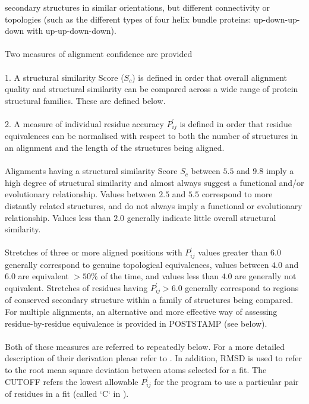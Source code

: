 secondary structures in similar orientations, but different
connectivity or topologies (such as the different types of four helix bundle
proteins: up-down-up-down with up-up-down-down).  \\
\\
Two measures of alignment confidence are provided \cite{rb92b}\\
\\
1. A structural similarity Score ($S_{c}$) is defined in order that
overall alignment quality and structural similarity can be compared
across a wide range of protein structural families.  These are defined below.\\
\\
2. A measure of individual residue accuracy $P_{ij}^{\prime}$ is 
defined in order that residue equivalences can be normalised with 
respect to both the number of structures in an alignment and the 
length of the structures being aligned.\\
\\
Alignments having a structural similarity Score $S_{c}$ between $5.5$ and
$9.8$ imply a high degree of structural similarity and almost always
suggest a functional and/or evolutionary relationship.
Values between $2.5$ and $5.5$ correspond to more distantly related
structures, and do not always imply a functional or evolutionary relationship.
Values less than $2.0$ generally indicate little overall structural similarity.\\
\\
Stretches of three or more aligned positions with $P_{ij}^{\prime}$ 
values greater than $6.0$ generally correspond to genuine topological 
equivalences, values between $4.0$ and $6.0$ are equivalent $> 50 \%$ of 
the time, and values less than $4.0$ are generally not equivalent.  
Stretches of residues having $P_{ij}^{\prime} > 6.0$ generally correspond to regions of 
conserved secondary structure within a family of structures being 
compared.  For multiple alignments, an alternative and more effective
way of assessing residue-by-residue equivalence is provided in POSTSTAMP (see below).\\
\\
Both of these measures are referred to repeatedly below.  For a more
detailed description of their derivation please refer to \cite{rb92b}.  
In addition, RMSD is used to refer to the root mean square 
deviation between atoms selected for a fit.  The CUTOFF refers the 
lowest allowable $P_{ij}^{\prime}$ for the program to use a particular 
pair of residues in a fit (called `C` in \cite{rb92b}).

